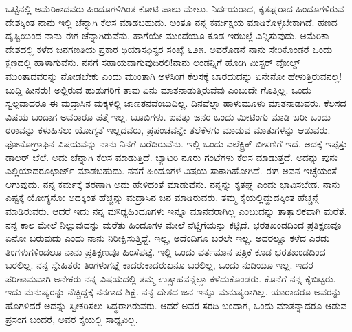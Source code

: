 ಒಟ್ಟಿನಲ್ಲಿ ಅಮೆರಿಕಾದವರು ಹಿಂದೂಗಳಿಗಿಂತ ಕೋಟಿ ಪಾಲು ಮೇಲು. ನಿರ್ದಯರಾದ, ಕೃತಘ್ನರಾದ ಹಿಂದೂಗಳಿರುವ ದೇಶಕ್ಕಿಂತ ನಾನು ಇಲ್ಲಿ ಚೆನ್ನಾಗಿ ಕೆಲಸ ಮಾಡಬಹುದು. ಅಂತೂ ನನ್ನ ಕರ್ಮಕ್ಷಯ ಮಾಡಿಕೊಳ್ಳಬೇಕಾಗಿದೆ. ಹಣದ ದೃಷ್ಟಿಯಿಂದ ನಾನು ಈಗ ಚೆನ್ನಾಗಿರುವೆನು, ಹಾಗೆಯೇ ಮುಂದೆಯೂ ಕೂಡ ಇರಬಲ್ಲೆ ಎನ್ನಿಸುವುದು. ಅಮೆರಿಕಾ ದೇಶದಲ್ಲಿ ಕಳೆದ ಜನಗಣತಿಯ ಪ್ರಕಾರ ಥಿಯಾಸಫಿಸ್ಟರ ಸಂಖ್ಯೆ ೬೨೫. ಅವರೊಡನೆ ನಾನು ಸೇರಿಕೊಂಡರೆ ಒಂದು ಕ್ಷಣದಲ್ಲಿ ಹಾಳಾಗುವೆನು. ನನಗೆ ಸಹಾಯವಾಗುವುದಿರಲಿ!ನಾನು ಲಂಡನ್ನಿಗೆ ಹೋಗಿ ಮಿಸ್ಟರ್ ವೋಲ್ಡ್ ಮುಂತಾದವರನ್ನು ನೋಡಬೇಕು ಎಂದು ಮುಂತಾಗಿ ಅಳಸಿಂಗ ಕೆಲಸಕ್ಕೆ ಬಾರದುದನ್ನು ಏನೇನೋ ಹೇಳುತ್ತಿರುವನಲ್ಲ! ಬುದ್ದಿ ಹೀನರು! ಅಲ್ಲಿರುವ ಹುಡುಗರಿಗೆ ತಾವು ಏನು ಮಾತನಾಡುತ್ತಿರುವೆವು ಎಂಬುದೇ ಗೊತ್ತಿಲ್ಲ. ಒಂದು ಸ್ವಲ್ಪವಾದರೂ ಈ ಮದ್ರಾಸಿನ ಮಕ್ಕಳಲ್ಲಿ ಜಾಣತನವೆಂಬುದಿಲ್ಲ. ದಿನವೆಲ್ಲಾ ಹಾಳುಮೂಳು ಮಾತನಾಡುವರು. ಕೆಲಸದ ವಿಷಯ ಬಂದಾಗ ಅವರಾರೂ ಪತ್ತೆ ಇಲ್ಲ. ಬೂಬಿಗಳು. ಐವತ್ತು ಜನರ ಒಂದು ಮೀಟಿಂಗು ಮಾಡಿ ಬರೀ ಒಂದು ಠರಾವನ್ನು ಕಳುಹಿಸಲು ಯೋಗ್ಯತೆ ಇಲ್ಲದವರು, ಪ್ರಪಂಚವನ್ನೇ ತಲೆಕೆಳಗು ಮಾಡುವ ಮಾತುಗಳನ್ನು ಆಡುವರು. ಫೋನೋಗ್ರಾಫಿನ ವಿಷಯವನ್ನು ನಾನು ನಿನಗೆ ಬರೆದಿರುವೆನು. ಇಲ್ಲಿ ಒಂದು ಎಲೆಕ್ಟ್ರಿಕ್ ಬೀಸಣಿಗೆ ಇದೆ. ಅದಕ್ಕೆ ಇಪ್ಪತ್ತು ಡಾಲರ್ ಬೆಲೆ. ಅದು ಚೆನ್ನಾಗಿ ಕೆಲಸ ಮಾಡುತ್ತಿದೆ. ಬ್ಯಾಟರಿ ನೂರು ಗಂಟೆಗಳು ಕೆಲಸ ಮಾಡುತ್ತದೆ. ಅದನ್ನು ಪುನಃ ಎಲ್ಲಿಯಾದರೂಛಾರ್ಜ್ ಮಾಡಬಹುದು. ನನಗೆ ಹಿಂದೂಗಳ ವಿಷಯ ಸಾಕಾಗಿಹೋಗಿದೆ. ಈಗ ಅವನ ಇಚ್ಛೆಯಂತೆ ಆಗುವುದು. ನನ್ನ ಕರ್ಮಕ್ಕೆ ಶರಣಾಗಿ ಅದು ಹೇಳಿದಂತೆ ಮಾಡುವೆನು. ನನ್ನನ್ನು ಕೃತಘ್ನ ಎಂದು ಭಾವಿಸಬೇಡ. ನಾನು ಎಷ್ಟಕ್ಕೆ ಯೋಗ್ಯನೋ ಅದಕ್ಕಿಂತ ಹೆಚ್ಚನ್ನು ಮದ್ರಾಸಿನ ಜನ ಮಾಡಿರುವರು. ತಮ್ಮ ಕೈಯಲ್ಲಿದ್ದುದಕ್ಕಿಂತ ಹೆಚ್ಚನ್ನೆ ಮಾಡಿರುವರು. ಆದರೆ ಇದು ನನ್ನ ಮೌಢ್ಯ\enginline{-}ಹಿಂದೂಗಳು ಇನ್ನೂ ಮಾನವರಾಗಿಲ್ಲ ಎಂಬುದನ್ನು ತಾತ್ಕಾಲಿಕವಾಗಿ ಮರೆತೆ. ನನ್ನ ಕಾಲ ಮೇಲೆ ನಿಲ್ಲುವುದನ್ನು ಮರೆತು ಹಿಂದೂಗಳ ಮೇಲೆ ನೆಟ್ಚಿಗೆಯನ್ನು ಕಟ್ಟಿದೆ. ಭರತಖಂಡದಿಂದ ಪ್ರತಿಕ್ಷಣವೂ ಏನೋ ಬರುವುದು ಎಂದು ನಾನು ನಿರೀಕ್ಷಿಸುತ್ತಿದ್ದೆ. ಇಲ್ಲ, ಅದೆಂದಿಗೂ ಬರಲೇ ಇಲ್ಲ. ಅದರಲ್ಲೂ ಕಳೆದ ಎರಡು ತಿಂಗಳುಗಳಿಂದಲೂ ನಾನು ಪ್ರತಿಕ್ಷಣವೂ ಹಿಂಸೆಪಟ್ಟೆ. ಇಲ್ಲಿ ಒಂದು ವರ್ತಮಾನ ಪತ್ರಿಕೆ ಕೂಡ ಭರತಖಂಡದಿಂದ ಬರಲಿಲ್ಲ. ನನ್ನ ಸ್ನೇಹಿತರು ತಿಂಗಳುಗಟ್ಲೆ ಕಾದರು\enginline{-}ಕಾದರು\enginline{-}ಏನೂ ಬರಲಿಲ್ಲ, ಒಂದು ನುಡಿಯೂ ಇಲ್ಲ. ಇದರ ಪರಿಣಾಮವಾಗಿ ಅನೇಕರು ನನ್ನ ವಿಷಯದಲ್ಲಿ ತಮ್ಮ ಉತ್ಸಾಹವನ್ನೆಲ್ಲಾ ಕಳೆದುಕೊಂಡರು. ಕೊನೆಗೆ ನನ್ನ ಕೈಬಿಟ್ಟರು. ಇದು ಮನುಷ್ಯರನ್ನು ನೆಚ್ಚಿದ್ದಕ್ಕೆ ನನಗಾದ ಶಿಕ್ಷೆ. ನನ್ನ ದೇಶದ ಜನ ಇನ್ನೂ ಮನುಷ್ಯರಾಗಿಲ್ಲ. ಯಾರಾದರೂ ಅವರನ್ನು ಹೊಗಳಿದರೆ ಅದನ್ನು ಸ್ವೀಕರಿಸಲು ಸಿದ್ಧರಾಗಿರುವರು. ಆದರೆ ಅವರ ಸರದಿ ಬಂದಾಗ, ಒಂದು ಮಾತನ್ನಾದರೂ ಆಡುವ ಪ್ರಸಂಗ ಬಂದರೆ, ಅವರ ಕೈಯಲ್ಲಿ ಸಾಧ್ಯವಿಲ್ಲ.

\eject

